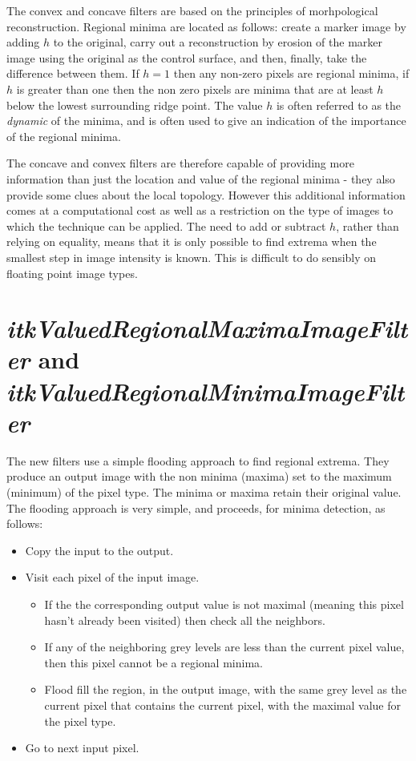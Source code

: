 \documentclass{llncs}
\begin{document}
The convex and concave filters are based on the principles of
morhpological reconstruction. Regional minima are located as follows:
create a marker image by adding $h$ to the original, carry out a
reconstruction by erosion of the marker image using the original as
the control surface, and then, finally, take the difference between
them. If $h=1$ then any non-zero pixels are regional minima, if $h$ is
greater than one then the non zero pixels are minima that are at least
$h$ below the lowest surrounding ridge point. The value $h$ is often
referred to as the {\em dynamic} of the minima, and is often used to
give an indication of the importance of the regional minima.

The concave and convex filters are therefore capable of providing more
information than just the location and value of the regional minima -
they also provide some clues about the local topology. However this
additional information comes at a computational cost as well as a
restriction on the type of images to which the technique can be
applied. The need to add or subtract $h$, rather than relying on
equality, means that it is only possible to find extrema when the
smallest step in image intensity is known. This is difficult to do
sensibly on floating point image types.

\section{{\em itkValuedRegionalMaximaImageFilter} and {\em itkValuedRegionalMinimaImageFilter}}
The new filters use a simple flooding approach to find regional
extrema. They produce an output image with the non minima (maxima) set
to the maximum (minimum) of the pixel type. The minima or maxima
retain their original value. 
The flooding approach is very simple, and proceeds, for minima detection, as follows:
\begin{itemize}
\item Copy the input to the output.
\item Visit each pixel of the input image. 
   \begin{itemize}	
   \item If the the corresponding output 
	 value is not maximal (meaning this pixel hasn't already been
      visited) then check all the neighbors. 
    \item If any of the neighboring grey levels are less than the current pixel 
      value, then this pixel cannot be a regional minima.
    \item Flood fill the region, in the output image, with the same grey level 
      as the current pixel that contains the current pixel, with the
      maximal value for the pixel type.
    \end{itemize}
\item Go to next input pixel.
\end{itemize}
\end{document}
